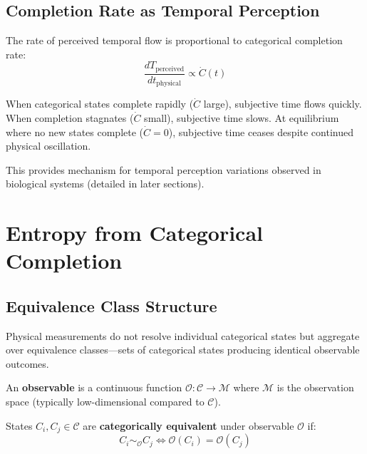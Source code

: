 \subsection{Completion Rate as Temporal Perception}

\begin{proposition}
\label{prop:temporal_flow}
The rate of perceived temporal flow is proportional to categorical completion rate:
\begin{equation}
\frac{dT_{\text{perceived}}}{dt_{\text{physical}}} \propto \dot{C}(t)
\end{equation}
\end{proposition}

When categorical states complete rapidly ($\dot{C}$ large), subjective time flows quickly. When completion stagnates ($\dot{C}$ small), subjective time slows. At equilibrium where no new states complete ($\dot{C} = 0$), subjective time ceases despite continued physical oscillation.

This provides mechanism for temporal perception variations observed in biological systems (detailed in later sections).

\section{Entropy from Categorical Completion}

\subsection{Equivalence Class Structure}

Physical measurements do not resolve individual categorical states but aggregate over equivalence classes—sets of categorical states producing identical observable outcomes.

\begin{definition}
\label{def:observable}
An \textbf{observable} is a continuous function $\mathcal{O}: \mathcal{C} \to \mathcal{M}$ where $\mathcal{M}$ is the observation space (typically low-dimensional compared to $\mathcal{C}$).
\end{definition}

\begin{definition}
\label{def:equivalence}
States $C_i, C_j \in \mathcal{C}$ are \textbf{categorically equivalent} under observable $\mathcal{O}$ if:
\begin{equation}
C_i \sim_{\mathcal{O}} C_j \iff \mathcal{O}(C_i) = \mathcal{O}(C_j)
\end{equation}
\end{definition}

